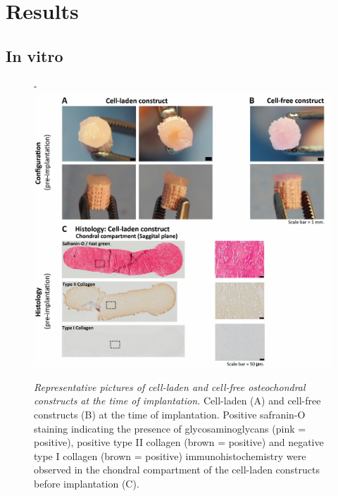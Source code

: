 \documentclass[twocolumn, empirical, authordate, issue]{jote-new-article}
\begin{document}
\section{Results} 

\subsection{In vitro} 
\begin{figure}[b]
\begin{adjustwidth}{-\fullwidthlen}{}
 \includegraphics[width=.965\linewidth]{media/image4.jpg}
\caption{\emph{Representative pictures of cell-laden and cell-free osteochondral constructs at the time of implantation.} Cell-laden (A) and cell-free constructs (B) at the time of implantation. Positive safranin-O staining indicating the presence of glycosaminoglycans (pink = positive), positive type II collagen (brown = positive) and negative type I collagen (brown = positive) immunohistochemistry were observed in the chondral compartment of the cell-laden constructs before implantation (C).}
\label{fig:figure4}
\end{adjustwidth}
\end{figure}
\end{document}
